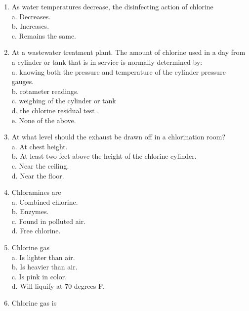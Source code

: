 \begin{tcolorbox}[breakable, enhanced,
colframe=blue!25,
colback=blue!10,
coltitle=blue!20!black,  
title= Chapter Assessment]
\begin{enumerate}
a. Staying low on the floor. \\
b. Holding breath and have help standing by. \\
c. Having self-contained air or oxygen supply and help standing by. \\
d. Covering nose and mouth with a wet handkerchief. \\
\item As water temperatures decrease, the disinfecting action of chlorine \\
a. Decreases. \\
b. Increases. \\
c. Remains the same. \\
\item At a wastewater treatment plant. The amount of chlorine used in a day from a cylinder or tank that is in service is normally determined by: \\
a. knowing both the pressure and temperature of the cylinder pressure gauges. \\
b. rotameter readings. \\
c. weighing of the cylinder or tank \\
d. the chlorine residual test . \\
e. None of the above. \\
\item At what level should the exhaust be drawn off in a chlorination room? \\
a. At chest height. \\
b. At least two feet above the height of the chlorine cylinder. \\
c. Near the ceiling. \\
d. Near the floor. \\
\item Chloramines are \\
a. Combined chlorine. \\
b. Enzymes. \\
c. Found in polluted air. \\
d. Free chlorine. \\
\item Chlorine gas \\
a. Is lighter than air. \\
b. Is heavier than air. \\
c. Is pink in color. \\
d. Will liquify at 70 degrees F. \\
\item Chlorine gas is \\

\end{enumerate}
\end{tcolorbox}
